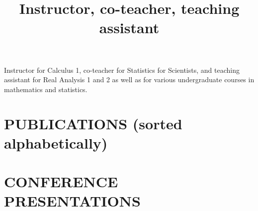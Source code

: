 \documentclass[overlapped, line, 10pt]{res} %
\begin{document}
\begin{resume}
\title{Instructor, co-teacher, teaching assistant}
\begin{position}
  Instructor for Calculus 1, co-teacher for Statistics for Scientists, and teaching assistant for Real Analysis 1 and 2 as well as for various undergraduate courses in mathematics and statistics.
\end{position}


\section{PUBLICATIONS (sorted alphabetically)}

\nocite{*}



\section{CONFERENCE PRESENTATIONS}


\end{resume}
\end{document}
